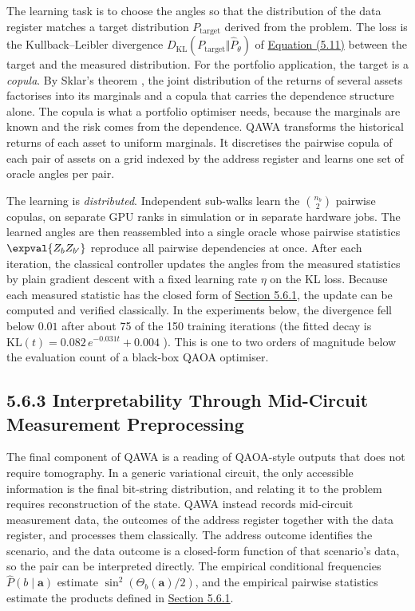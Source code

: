 \documentclass{report}
\theoremstyle{plain}
\theoremstyle{definition}
\theoremstyle{remark}
\begin{document}
The learning task is to choose the angles so that the distribution of the data register matches a target distribution $P_{\mathrm{target}}$ derived from the problem. The loss is the Kullback--Leibler divergence $D_{\mathrm{KL}}(P_{\mathrm{target}}\Vert\hat{P}_{\theta})$ of \hyperref[eq:nisq:kl]{Equation (5.11)} between the target and the measured distribution. For the portfolio application, the target is a \emph{copula}. By Sklar's theorem \cite{sklar1959copula}, the joint distribution of the returns of several assets factorises into its marginals and a copula that carries the dependence structure alone. The copula is what a portfolio optimiser needs, because the marginals are known and the risk comes from the dependence. QAWA transforms the historical returns of each asset to uniform marginals. It discretises the pairwise copula of each pair of assets on a grid indexed by the address register and learns one set of oracle angles per pair.

The learning is \emph{distributed}. Independent sub-walks learn the $\binom{n_{b}}{2}$ pairwise copulas, on separate GPU ranks in simulation or in separate hardware jobs. The learned angles are then reassembled into a single oracle whose pairwise statistics $\expval{Z_{b}Z_{b'}}$ reproduce all pairwise dependencies at once. After each iteration, the classical controller updates the angles from the measured statistics by plain gradient descent with a fixed learning rate $\eta$ on the KL loss. Because each measured statistic has the closed form of \hyperref[sec:nisq:oracle]{Section 5.6.1}, the update can be computed and verified classically. In the experiments below, the divergence fell below $0.01$ after about 75 of the 150 training iterations (the fitted decay is $\mathrm{KL}(t)=0.082\,e^{-0.031t}+0.004$ \cite{guo2025qawa}). This is one to two orders of magnitude below the evaluation count of a black-box QAOA optimiser.

\subsection{5.6.3 Interpretability Through Mid-Circuit Measurement Preprocessing}\label{sec:nisq:interp}

The final component of QAWA is a reading of QAOA-style outputs that does not require tomography. In a generic variational circuit, the only accessible information is the final bit-string distribution, and relating it to the problem requires reconstruction of the state. QAWA instead records mid-circuit measurement data, the outcomes of the address register together with the data register, and processes them classically. The address outcome identifies the scenario, and the data outcome is a closed-form function of that scenario's data, so the pair can be interpreted directly. The empirical conditional frequencies $\hat{P}(b\mid\bm{a})$ estimate $\sin^{2}(\Theta_{b}(\bm{a})/2)$, and the empirical pairwise statistics estimate the products defined in \hyperref[sec:nisq:oracle]{Section 5.6.1}.
\end{document}
